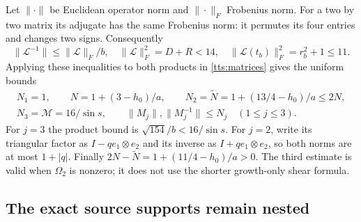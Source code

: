Let $\|\cdot\|$ be Euclidean operator norm and
$\|\cdot\|_F$ Frobenius norm. For a two by two matrix its
adjugate has the same Frobenius norm: it permutes its four entries
and changes two signs. Consequently
\[
 \|\mathcal L^{-1}\|\leq\|\mathcal L\|_F/b,\quad
 \|\mathcal L\|_F^2=D+R<14,\quad
 \|\mathcal L(t_b)\|_F^2=r_b^2+1\leq11.
\]
Applying these inequalities to both products in
\eqref{tts:matrices} gives the uniform bounds
\begin{equation}\label{tts:matrixbounds}
 \begin{gathered}
 N_1=1,\qquad N=1+(3-h_0)/a,\qquad
 N_2=\widetilde N=1+(13/4-h_0)/a\leq2N,\\
 N_3=\mathcal M=16/\sin s,\qquad
 \|M_j\|,\|M_j^{-1}\|\leq N_j\quad(1\leq j\leq3).
 \end{gathered}
\end{equation}
For $j=3$ the product bound is $\sqrt{154}/b<16/\sin s$.
For $j=2$, write its triangular factor as $I-qe_1\otimes e_2$
and its inverse as $I+qe_1\otimes e_2$, so both norms are at
most $1+|q|$. Finally
$2N-\widetilde N=1+(11/4-h_0)/a>0$.
The third estimate is valid when $\Omega_2$ is nonzero; it does
not use the shorter growth-only shear formula.

\subsection{The exact source supports remain nested}

